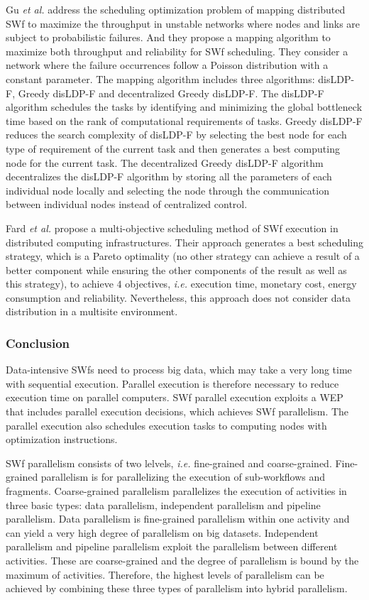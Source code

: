 Gu \textit{et al.} \cite{Gu2013} address the scheduling optimization problem of mapping distributed SWf to maximize the throughput in unstable networks where nodes
and links are subject to probabilistic failures. 
And they propose a mapping algorithm to
maximize both throughput and reliability for SWf scheduling.
They consider a network where the failure occurrences follow a Poisson distribution
with a constant parameter. The mapping algorithm includes three
algorithms: disLDP-F, Greedy disLDP-F and decentralized Greedy
disLDP-F. The disLDP-F algorithm schedules the tasks by identifying
and minimizing the global bottleneck time based on the rank of computational
requirements of tasks. Greedy disLDP-F reduces the search complexity
of disLDP-F by selecting the best node for each type of requirement
of the current task and then generates a best computing node for the current
task. The decentralized Greedy disLDP-F algorithm decentralizes the disLDP-F
algorithm by storing all the parameters of each individual node locally
and selecting the node through the communication between individual
nodes instead of centralized control.

Fard \textit{et al.} \cite{Fard2014} propose a multi-objective scheduling method of SWf execution in distributed computing infrastructures. Their approach generates a best scheduling strategy, which is a Pareto optimality (no other strategy can achieve a result of a better component while ensuring the other components of the result as well as this strategy), to achieve $4$ objectives, \textit{i.e.} execution time, monetary cost, energy consumption and reliability. Nevertheless, this approach does not consider data distribution in a multisite environment. 


\subsubsection{Conclusion}

Data-intensive SWfs need to process big data, which
may take a very long time with sequential execution.
Parallel execution is therefore necessary to reduce execution time on parallel computers. 
SWf parallel execution exploits a WEP that includes parallel execution decisions,
which achieves SWf parallelism.
The parallel execution also schedules execution tasks to computing nodes with optimization instructions. 

SWf parallelism consists of two lelvels, \textit{i.e.} fine-grained and coarse-grained. 
Fine-grained parallelism is for parallelizing the execution of sub-workflows and fragments.
Coarse-grained parallelism parallelizes the execution of activities in three basic types: data parallelism,
independent parallelism and pipeline parallelism. Data parallelism is
fine-grained parallelism within one activity
and can yield a very high degree of parallelism on big datasets.
Independent parallelism and pipeline parallelism exploit the
parallelism between different activities.
These are coarse-grained and the degree of parallelism is bound by the
maximum of activities.
Therefore, the highest levels of parallelism can be achieved by combining
these three types of parallelism into hybrid parallelism.

